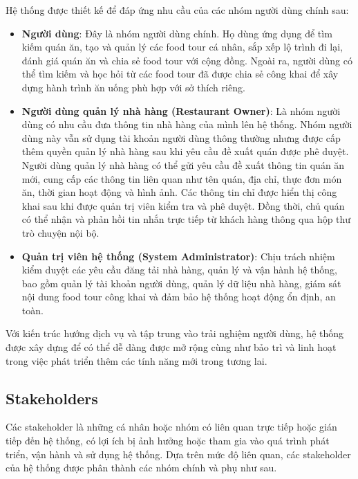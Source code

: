 Hệ thống được thiết kế để đáp ứng nhu cầu của các nhóm người dùng chính sau:

\begin{itemize}[label=\textbullet]

    \item \textbf{Người dùng}: 
    Đây là nhóm người dùng chính. Họ dùng ứng dụng để tìm kiếm quán ăn, 
    tạo và quản lý các food tour cá nhân, sắp xếp lộ trình đi lại, đánh giá 
    quán ăn và chia sẻ food tour với cộng đồng. Ngoài ra, người dùng có thể 
    tìm kiếm và học hỏi từ các food tour đã được chia sẻ công khai để xây dựng 
    hành trình ăn uống phù hợp với sở thích riêng.

    \item \textbf{Người dùng quản lý nhà hàng (Restaurant Owner)}:
    Là nhóm người dùng có nhu cầu đưa thông tin nhà hàng của mình lên hệ thống.
    Nhóm người dùng này vẫn sử dụng tài khoản người dùng thông thường nhưng được
    cấp thêm quyền quản lý nhà hàng sau khi yêu cầu đề xuất quán được phê duyệt.
    Người dùng quản lý nhà hàng có thể gửi yêu cầu đề xuất thông tin quán ăn mới,
    cung cấp các thông tin liên quan như tên quán, địa chỉ, thực đơn món ăn,
    thời gian hoạt động và hình ảnh. Các thông tin chỉ được hiển thị công khai sau khi
    được quản trị viên kiểm tra và phê duyệt. Đồng thời, chủ quán có thể nhận và phản hồi
    tin nhắn trực tiếp từ khách hàng thông qua hộp thư trò chuyện nội bộ.

    \item \textbf{Quản trị viên hệ thống (System Administrator)}:
    Chịu trách nhiệm kiểm duyệt các yêu cầu đăng tải nhà hàng, quản lý và vận hành hệ thống, bao gồm quản lý tài khoản
    người dùng, quản lý dữ liệu nhà hàng, giám sát nội dung food tour công khai và đảm bảo hệ thống hoạt động
    ổn định, an toàn.

\end{itemize}

Với kiến trúc hướng dịch vụ và tập trung vào trải nghiệm người dùng, 
hệ thống được xây dựng để có thể dễ dàng được mở rộng cùng như bảo trì và 
linh hoạt trong việc phát triển thêm các tính năng mới trong tương lai.

\subsection{Stakeholders}
Các stakeholder là những cá nhân hoặc nhóm có liên quan trực tiếp hoặc gián tiếp đến hệ
thống, có lợi ích bị ảnh hưởng hoặc tham gia vào quá trình phát triển, vận hành và sử dụng hệ
thống. Dựa trên mức độ liên quan, các stakeholder của hệ thống được phân thành các nhóm
chính và phụ như sau.

